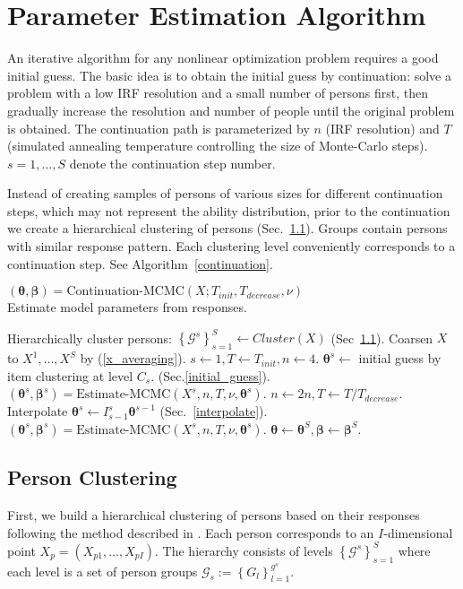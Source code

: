 \documentclass{article}
\newcommand{\cG}{\mathcal{G}}
\newcommand{\ta}{\theta}
\newcommand{\bbeta}{\boldsymbol\beta}
\newcommand{\bta}{\boldsymbol\ta}
\newcommand{\lla}{\longleftarrow}
\begin{document}
\section{Parameter Estimation Algorithm}
An iterative algorithm for any nonlinear optimization problem requires a good initial guess. The basic idea is to obtain the initial guess by continuation: solve a problem with a low IRF resolution and a small number of persons first, then gradually increase the resolution and number of people until the original problem is obtained. The continuation path is parameterized by $n$ (IRF resolution) and $T$ (simulated annealing temperature controlling the size of Monte-Carlo steps). $s=1,\dots,S$ denote the continuation step number.

Instead of creating samples of persons of various sizes for different continuation steps, which may not represent the ability distribution, prior to the continuation we create a hierarchical clustering of persons (Sec.~\ref{miniclustering}). Groups contain persons with similar response pattern. Each clustering level conveniently corresponds to a continuation step. See Algorithm~\ref{continuation}.

\begin{algorithm}
	\label{continuation}
	\caption[]{$(\bta, \bbeta) = {\mbox{Continuation-MCMC}}(X; T_{init}, T_{decrease}, \nu)$\\\hspace{\textwidth}Estimate model parameters from responses.}
	\begin{algorithmic}
    \STATE Hierarchically cluster persons: $\left\{\cG^s\right\}_{s=1}^S \lla Cluster(X)$ (Sec~\ref{miniclustering}).
    \STATE Coarsen $X$ to $X^1,\dots,X^S$ by (\ref{x_averaging}).
    \STATE $s \lla 1, T \lla T_{init}, n \lla 4$.
    \STATE $\bta^s \lla$ initial guess by item clustering at level $C_s$. (Sec.\ref{initial_guess}).
    \STATE $(\bta^s, \bbeta^s) = {\mbox{Estimate-MCMC}}(X^s, n, T, \nu, \bta^s)$.
    	\STATE $n \lla 2 n, T \lla T / T_{decrease}$.
    	\STATE Interpolate $\bta^s \lla I_{s-1}^s \bta^{s-1}$ (Sec.~\ref{interpolate}). 
	    \STATE $(\bta^s, \bbeta^s) = {\mbox{Estimate-MCMC}}(X^s, n, T, \nu, \bta^s)$.
   	\ENDFOR
   	\STATE $\bta \lla \bta^S, \bbeta \lla \bbeta^S$.
	\end{algorithmic}
\end{algorithm}

\subsection{Person Clustering}
\label{miniclustering}
First, we build a hierarchical clustering of persons based on their responses following the method described in \cite{miniclustering}. Each person corresponds to an $I$-dimensional point $X_p = (X_{p1},\dots,X_{pI})$. The hierarchy consists of levels $\left\{\cG^s\right\}_{s=1}^S$ where each level is a set of person groups $\cG_s := \left\{G_l\right\}_{l=1}^{g^s}$.
\end{document}
